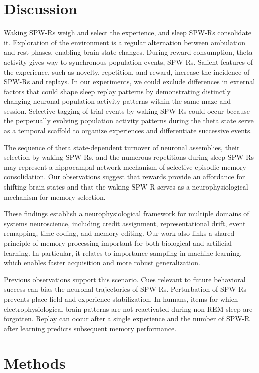 \section{Discussion}

Waking SPW-Rs weigh and select the experience, and sleep SPW-Rs consolidate it. Exploration of the environment is a regular alternation between ambulation and rest phases, enabling brain state changes. During reward consumption, theta activity gives way to synchronous population events, SPW-Rs. Salient features of the experience, such as novelty, repetition, and reward, increase the incidence of SPW-Rs and replays. In our experiments, we could exclude differences in external factors that could shape sleep replay patterns by demonstrating distinctly changing neuronal population activity patterns within the same maze and session. Selective tagging of trial events by waking SPW-Rs could occur because the perpetually evolving population activity patterns during the theta state serve as a temporal scaffold to organize experiences and differentiate successive events.

The sequence of theta state-dependent turnover of neuronal assemblies, their selection by waking SPW-Rs, and the numerous repetitions during sleep SPW-Rs may represent a hippocampal network mechanism of selective episodic memory consolidation. Our observations suggest that rewards provide an affordance for shifting brain states and that the waking SPW-R serves as a neurophysiological mechanism for memory selection.

These findings establish a neurophysiological framework for multiple domains of systems neuroscience, including credit assignment, representational drift, event remapping, time coding, and memory editing. Our work also links a shared principle of memory processing important for both biological and artificial learning. In particular, it relates to importance sampling in machine learning, which enables faster acquisition and more robust generalization.

Previous observations support this scenario. Cues relevant to future behavioral success can bias the neuronal trajectories of SPW-Rs. Perturbation of SPW-Rs prevents place field and experience stabilization. In humans, items for which electrophysiological brain patterns are not reactivated during non-REM sleep are forgotten. Replay can occur after a single experience and the number of SPW-R after learning predicts subsequent memory performance.

\section{Methods}

